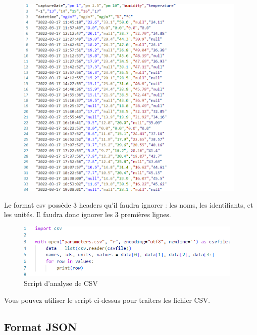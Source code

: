     \begin{figure}[H]
        \includegraphics[width=13cm]{resources/csv}
        \label{fig:csv}
    \end{figure}

    Le format csv possède 3 headers qu'il faudra ignorer : les noms, les identifiants, et les unités.
    Il faudra donc ignorer les 3 premières lignes.

    \begin{figure}[H]
        \includegraphics[width=11cm]{resources/csv_exemple}
        \caption{Script d'analyse de CSV}\label{fig:csv-exemple}
    \end{figure}

    Vous pouvez utiliser le script ci-dessus pour traiters les fichier CSV.

    \subsection{Format JSON}\label{subsec:json}

